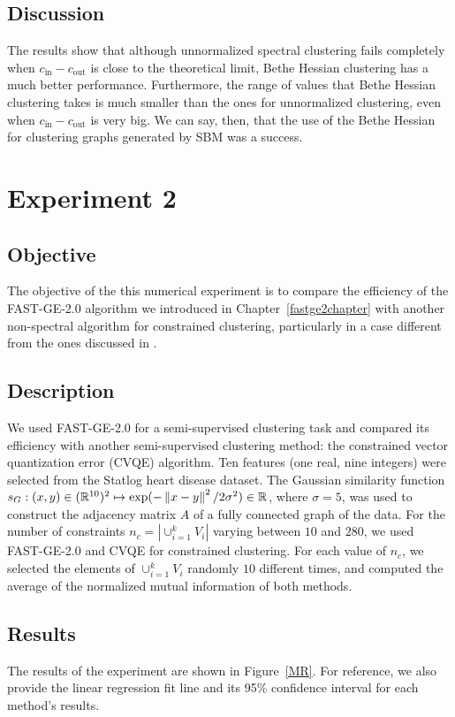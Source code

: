 \subsection*{Discussion}
The results show that although unnormalized spectral clustering fails completely when $c_\text{in} - c_\text{out}$ is close to the theoretical limit, Bethe Hessian clustering has a much better performance. 
Furthermore, the range of values that Bethe Hessian clustering takes is much smaller than the ones for unnormalized clustering, even when $c_\text{in} - c_\text{out}$ is very big.
We can say, then, that the use of the Bethe Hessian for clustering graphs generated by SBM was a success.

\section{Experiment 2}
\subsection*{Objective}
The objective of the this numerical experiment is to compare the efficiency of the FAST-GE-2.0 algorithm we introduced in Chapter~\ref{fastge2chapter} with another non-spectral algorithm for constrained clustering, particularly in a case different from the ones discussed in \cite{fastge2}.
\subsection*{Description}
We used FAST-GE-2.0 for a semi-supervised clustering task and compared its efficiency with another semi-supervised clustering method: the constrained vector quantization error (CVQE) algorithm.
Ten features (one real, nine integers) were selected from the Statlog heart disease dataset.
The Gaussian similarity function $s_G: (x,y) \in (\mathbb R^{10})^2 \mapsto \exp ( - \left\lVert x-y\right\rVert^2/2 \sigma ^2) \in \mathbb R$, where $\sigma = 5$, was used to construct the adjacency matrix $A$ of a fully connected graph of the data.
For the number of constraints $n_c = \left| \cup_{i=1}^k V_i \right|$ varying between $10$ and $280$, we used FAST-GE-2.0 and CVQE for constrained clustering.
For each value of $n_c$, we selected the elements of $\cup_{i=1}^k V_i$ randomly $10$ different times, and computed the average of the normalized mutual information of both methods.

\subsection*{Results}
The results of the experiment are shown in Figure~\vref{MR}.
For reference, we also provide the linear regression fit line and its 95\% confidence interval for each method's results.

